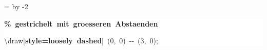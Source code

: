 \begingroup
\ttfamily
{}
=\textwidth
\advance{} by -2\fboxsep
\noindent
\colorbox{background}
{%
\parbox{\dimen255}
{%
\rule[-0.5ex]{0pt}{2.5ex}\hspace*{0.0em}\textcolor{G}{\textbf{\%~gestrichelt~mit~groesseren~Abstaenden}}\\
\rule[-0.5ex]{0pt}{2.5ex}\hspace*{0.0em}\textbackslash{}draw[\textcolor{R}{\textbf{style=loosely~dashed}}]~(0,~0)~{-}{-}~(3,~0);}%
}%
\endgroup
